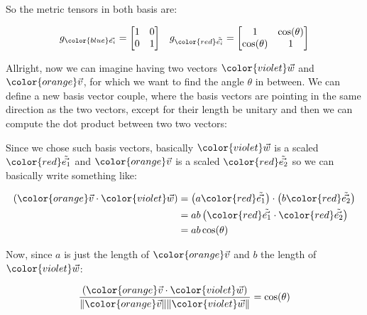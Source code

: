 So the metric tensors in both basis are:

\begin{align*}
    g_{\color{blue}\vec{e_i}} = \begin{bmatrix}
        1 & 0\\
        0 & 1
    \end{bmatrix} &&
    g_{\color{red}\tilde{\vec{e_i}}} = \begin{bmatrix}
        1 & \cos(\theta)\\
        \cos(\theta) & 1
    \end{bmatrix}
\end{align*}

Allright, now we can imagine having two vectors $\color{violet}\vec{w}$ and $\color{orange}\vec{v}$, for which 
we want to find the angle $\theta$ in between. We can define a new basis vector couple, where the basis vectors are pointing in the same direction as the two
vectors, except for their length be unitary and then we can compute the dot product between two two vectors:

\begin{center}

\end{center}

Since we chose such basis vectors, basically $\color{violet}\vec{w}$ is a scaled $\color{red}\tilde{\vec{e_1}}$ and 
$\color{orange}\vec{v}$ is a scaled $\color{red}\tilde{\vec{e_2}}$ so we can basically write something like:

\begin{align*}
    \left(\begingroup\color{orange}\vec{v}\endgroup \cdot \begingroup\color{violet}\vec{w}\endgroup\right) &= \left(a \begingroup\color{red}\tilde{\vec{e_1}}\endgroup \right) \cdot \left(b \begingroup\color{red}\tilde{\vec{e_2}}\endgroup \right)\\
    &= ab \left(\begingroup\color{red}\tilde{\vec{e_1}}\endgroup \cdot \begingroup\color{red}\tilde{\vec{e_2}}\endgroup\right)\\
    &= ab \cos(\theta)
\end{align*}

Now, since $a$ is just the length of $\color{orange}\vec{v}$ and $b$ the length of $\color{violet}\vec{w}$:

\begin{equation}
   \frac{\left(\begingroup\color{orange}\vec{v}\endgroup \cdot \begingroup\color{violet}\vec{w}\endgroup\right)}
   {\|\begingroup\color{orange}\vec{v}\endgroup\| \|\begingroup\color{violet}\vec{w}\endgroup\|}= \cos(\theta)
\end{equation}

